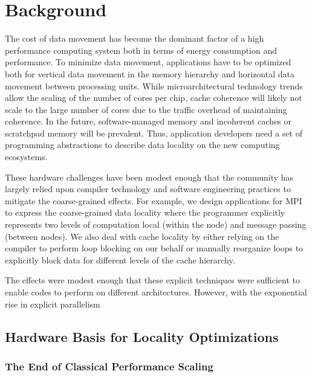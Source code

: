 \chapter{Background}
\label{ch:background}

The cost of data movement has become the dominant factor of a high performance computing system both in terms of energy consumption and performance. To minimize data movement, applications have to be optimized both for vertical data movement in the memory hierarchy and horizontal data movement between processing units. While microarchitectural technology trends allow the scaling of the number of cores per chip, cache coherence  will likely not scale to the large number of cores due to the traffic overhead of maintaining coherence. In the future, software-managed memory and incoherent caches or scratchpad memory will be prevalent. Thus, application developers need a set of programming abstractions to describe data locality on the new computing ecosystems.

These hardware challenges have been modest enough that the community has largely relied upon compiler technology and software engineering practices to mitigate the coarse-grained effects.  For example, we design applications for MPI to express the coarse-grained data locality where the programmer explicitly represents two levels of computation local (within the node) and message passing (between nodes).  We also deal with cache locality by either relying on the compiler to perform loop blocking on our behalf or manually reorganize loops to explicitly block data for different levels of the cache hierarchy.

The effects were modest enough that these explicit techniques were sufficient to enable codes to perform on different architectures.  However, with the exponential rise in explicit parallelism

\section{Hardware Basis for Locality Optimizations}

\subsection{The End of Classical Performance Scaling}


